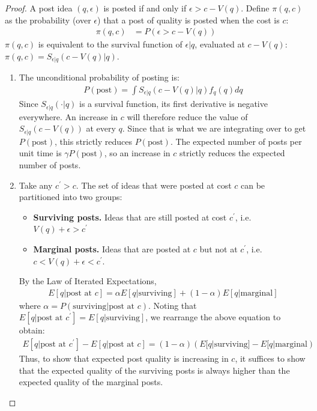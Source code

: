 \begin{proof}
A post idea $(q, \epsilon)$ is posted if and only if $\epsilon > c - V(q)$. Define $\pi(q,c)$ as the probability (over $\epsilon$) that a post of quality is posted when the cost is $c$:
\begin{align*}
\pi(q,c) &= P(\epsilon > c - V(q)) 
\end{align*}
$\pi(q,c)$ is equivalent to the survival function of $\epsilon|q$, evaluated at $c - V(q)$: $\pi(q,c) = S_{\epsilon|q}(c - V(q) | q)$.
\begin{enumerate}[label=(\roman*)]
\item The unconditional probability of posting is:
\begin{align*}
P(\text{post}) = \int S_{\epsilon|q}(c-V(q)|q)f_q(q)dq
\end{align*}
Since $S_{\epsilon|q}(\cdot|q)$ is a survival function, its first derivative is negative everywhere. An increase in $c$ will therefore reduce the value of $S_{\epsilon|q}(c - V(q))$ at every $q$. Since that is what we are integrating over to get $P(\text{post})$, this strictly reduces $P(\text{post})$. The expected number of posts per unit time is $\gamma P(\text{post})$, so an increase in $c$ strictly reduces the expected number of posts.

\item Take any $c^\prime > c$. The set of ideas that were posted at cost $c$ can be partitioned into two groups:
\begin{itemize}
\item \textbf{Surviving posts.} Ideas that are still posted at cost $c^\prime$, i.e. $V(q) + \epsilon > c^\prime$
\item \textbf{Marginal posts.} Ideas that are posted at $c$ but not at $c^\prime$, i.e. $c < V(q) + \epsilon < c^\prime$.
\end{itemize}
By the Law of Iterated Expectations,
\begin{align*}
E[q | \text{post at } c] = \alpha E[q | \text{surviving}] + (1-\alpha) E[q | \text{marginal}]
\end{align*}
where $\alpha = P(\text{surviving} | \text{post at } c)$. Noting that $E[q|\text{post at } c^\prime] = E[q|\text{surviving}]$, we rearrange the above equation to obtain:
\begin{align*}
E[q|\text{post at } c^\prime] - E[q|\text{post at } c] = (1-\alpha) \left( E[q|\text{surviving}] - E[q|\text{marginal}\right)
\end{align*}
Thus, to show that expected post quality is increasing in $c$, it suffices to show that the expected quality of the surviving posts is always higher than the expected quality of the marginal posts. 


\end{enumerate}
\end{proof}

